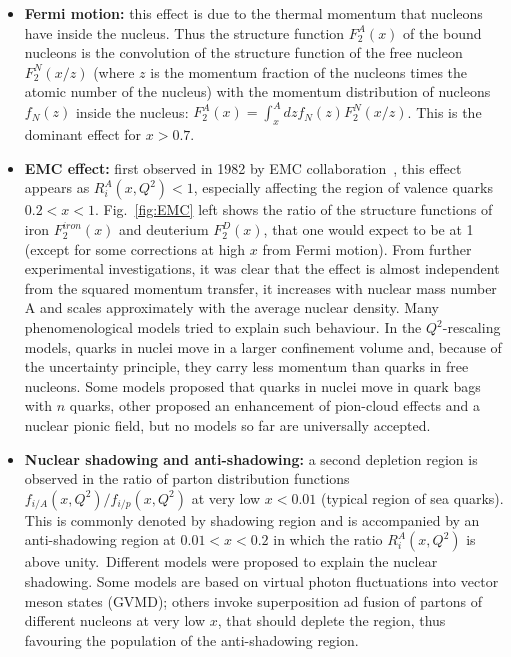 \begin{itemize}
\item {\bf Fermi motion:} this effect is due to the 
thermal momentum that nucleons have inside the nucleus. 
Thus the structure function $F^A_2(x)$ of the bound nucleons
is the convolution of the structure function of the free nucleon 
$F^N_2(x/z)$ (where $z$ is the momentum fraction
of the nucleons times the atomic number of the nucleus) 
with the momentum distribution
of nucleons $f_N(z)$ inside the nucleus: 
$F^A_2(x) = \int_x^A dz f_N(z) F_2^N(x/z)$.
This is the dominant effect for $x > 0.7$.
\item {\bf EMC effect:} first observed in 1982 by EMC collaboration~\cite{Aubert:1983xm},
this effect appears as $R_i^A(x,Q^2)<1$, especially affecting the region 
of valence quarks $0.2 < x < 1$. Fig.~\ref{fig:EMC} left shows the ratio of the structure functions 
of iron $F^{iron}_2(x)$ and deuterium $F^D_2(x)$, that one would expect to be at 1 (except for 
some corrections at high $x$ from Fermi motion). From further
experimental investigations, it was clear that the effect is almost independent from the 
squared momentum transfer, it increases with nuclear mass 
number A and scales approximately with the average nuclear density. 
Many phenomenological models tried to explain such behaviour. 
In the $Q^2$-rescaling models, 
quarks in nuclei move in a larger confinement volume and, 
because of the uncertainty principle, 
they carry less momentum than quarks in free nucleons. 
Some models proposed that 
quarks in nuclei move in quark bags with $n$ quarks, 
other proposed an enhancement 
of pion-cloud effects and a nuclear pionic field, 
but no models so far are universally accepted. 

\item {\bf Nuclear shadowing and anti-shadowing:} a second depletion region
is observed in the ratio of parton distribution functions $f_{i/A}(x,Q^2) / f_{i/p}(x,Q^2)$ 
at very low $x<0.01$ (typical region of sea quarks). This is commonly denoted 
by shadowing region and is accompanied by
an anti-shadowing region at $0.01 < x < 0.2$ in which the ratio $R_i^A(x,Q^2)$
is above unity.~Different models were
proposed to explain the nuclear shadowing. Some models are based on virtual 
photon fluctuations into vector meson states (GVMD); others
invoke superposition ad fusion of partons of different nucleons at very low $x$, that should deplete the 
region, thus favouring the population of the anti-shadowing region.

\end{itemize}


